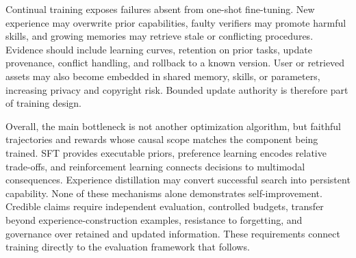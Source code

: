 Continual training exposes failures absent from one-shot fine-tuning. New experience may overwrite prior capabilities, faulty verifiers may promote harmful skills, and growing memories may retrieve stale or conflicting procedures. Evidence should include learning curves, retention on prior tasks, update provenance, conflict handling, and rollback to a known version. User or retrieved assets may also become embedded in shared memory, skills, or parameters, increasing privacy and copyright risk. Bounded update authority is therefore part of training design.

Overall, the main bottleneck is not another optimization algorithm, but faithful trajectories and rewards whose causal scope matches the component being trained. SFT provides executable priors, preference learning encodes relative trade-offs, and reinforcement learning connects decisions to multimodal consequences. Experience distillation may convert successful search into persistent capability. None of these mechanisms alone demonstrates self-improvement. Credible claims require independent evaluation, controlled budgets, transfer beyond experience-construction examples, resistance to forgetting, and governance over retained and updated information. These requirements connect training directly to the evaluation framework that follows.
